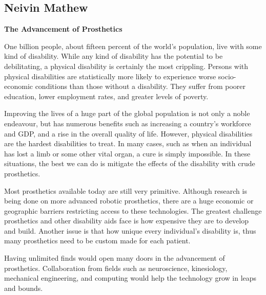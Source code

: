 \documentclass[12pt,letterpaper]{article}
\begin{document}
\subsection{Neivin Mathew}
\textbf{The Advancement of Prosthetics}\par
One billion people, about fifteen percent of the world's population, live with some kind of disability. While any kind of disability has the potential to be debilitating, a physical disability is certainly the most crippling. Persons with physical disabilities are statistically more likely to experience worse socio-economic conditions than those without a disability. They suffer from poorer education, lower employment rates, and greater levels of poverty.\par
Improving the lives of a huge part of the global population is not only a noble endeavour, but has numerous benefits such as increasing a country's workforce and GDP, and a rise in the overall quality of life. However, physical disabilities are the hardest disabilities to treat. In many cases, such as when an individual has lost a limb or some other vital organ, a cure is simply impossible. In these situations, the best we can do is mitigate the effects of the disability with crude prosthetics.\par
Most prosthetics available today are still very primitive. Although research is being done on more advanced robotic prosthetics, there are a huge economic or geographic barriers restricting access to these technologies. The greatest challenge prosthetics and other disability aids face is how expensive they are to develop and build. Another issue is that how unique every individual's disability is, thus many prosthetics need to be custom made for each patient. \par
Having unlimited finds would open many doors in the advancement of prosthetics. Collaboration from fields such as neuroscience, kinesiology, mechanical engineering, and computing would help the technology grow in leaps and bounds.


\clearpage
\end{document}

